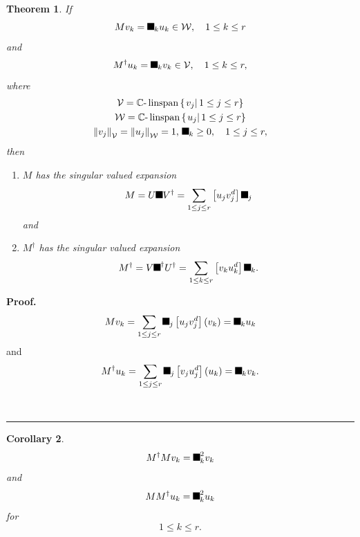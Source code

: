 \documentclass[aps,preprint]{revtex4}%
\providecommand{\U}[1]{\protect\rule{.1in}{.1in}}
\newtheorem{theorem}{Theorem}
\newtheorem{corollary}[theorem]{Corollary}
\newenvironment{proof}[1][Proof]{\noindent\textbf{#1.} }{\ \rule{0.5em}{0.5em}}
\begin{document}
\begin{theorem}
If
\begin{equation}
Mv_{k}=\U{3c3} _{k}u_{k}\in\mathcal{W},\quad1\leq k\leq r
\end{equation}
and
\begin{equation}
M^{\dagger}u_{k}=\U{3c3} _{k}v_{k}\in\mathcal{V},\quad1\leq k\leq r,
\end{equation}
where
\begin{gather}
\mathcal{V}=\mathbb{C}\text{-}\operatorname*{linspan}\left\{  \left.
v_{j}\right\vert 1\leq j\leq r\right\} \\
\mathcal{W}=\mathbb{C}\text{-}\operatorname*{linspan}\left\{  \left.
u_{j}\right\vert 1\leq j\leq r\right\} \\
\left\Vert v_{j}\right\Vert _{\mathcal{V}}=\left\Vert u_{j}\right\Vert
_{\mathcal{W}}=1,\,\U{3c3} _{k}\geq0,\quad1\leq j\leq r,
\end{gather}
then

\begin{enumerate}
\item $M$ has the singular valued expansion
\begin{equation}
M=U\U{3a3} V^{\dagger}=\sum_{1\leq j\leq r}\left[  u_{j}v_{j}^{d}\right]
\U{3c3} _{j}%
\end{equation}
and

\item $M^{\dagger}$ has the singular valued expansion%
\begin{equation}
M^{\dagger}=V\U{3a3} ^{\dagger}U^{\dagger}=\sum_{1\leq k\leq r}\left[
v_{k}u_{k}^{d}\right]  \U{3c3} _{k}.
\end{equation}

\end{enumerate}
\end{theorem}

\begin{proof}%
\begin{equation}
Mv_{k}=\sum_{1\leq j\leq r}\U{3c3} _{j}\left[  u_{j}v_{j}^{d}\right]  \left(
v_{k}\right)  =\U{3c3} _{k}u_{k}%
\end{equation}
and
\begin{equation}
M^{\dagger}u_{k}=\sum_{1\leq j\leq r}\U{3c3} _{j}\left[  v_{j}u_{j}%
^{d}\right]  \left(  u_{k}\right)  =\U{3c3} _{k}v_{k}.
\end{equation}

\end{proof}

\begin{corollary}%
\begin{equation}
M^{\dagger}Mv_{k}=\U{3c3} _{k}^{2}v_{k}%
\end{equation}
and
\begin{equation}
MM^{\dagger}u_{k}=\U{3c3} _{k}^{2}u_{k}%
\end{equation}
for
\begin{equation}
1\leq k\leq r.
\end{equation}

\end{corollary}
\end{document}
